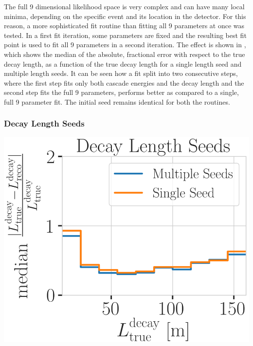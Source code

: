 The full 9 dimensional likelihood space is very complex and can have many local minima, depending on the specific event and its location in the detector. For this reason, a more sophisticated fit routine than fitting all 9 parameters at once was tested. In a first fit iteration, some parameters are fixed and the resulting best fit point is used to fit all 9 parameters in a second iteration. The effect is shown in , which shows the median of the absolute, fractional error with respect to the true decay length, as a function of the true decay length for a single length seed and multiple length seeds. It can be seen how a fit split into two consecutive steps, where the first step fits only both cascade energies and the decay length and the second step fits the full 9 parameters, performs better as compared to a single, full 9 parameter fit. The initial seed remains identical for both the routines.


\subsubsection{Decay Length Seeds}

\begin{marginfigure}
	\centering
    \includegraphics{figures/results/190605_reco_optimization/decay_length_seeding_median_decay_length_resolution_Good + L7 + reco E1,E2 above 3_fix_y_new.png}
    \caption[Decay length resolutions to optimize length seeding]{Decay length resolution as a function of the true decay length, comparing the same fit routine seeded with just the seed decay length and seeded with a decay length of \SI{5}{\meter}, \SI{25}{\meter}, \SI{50}{\meter}, \SI{100}{\meter}, and \SI{200}{\meter} on the left.}
\end{marginfigure}

